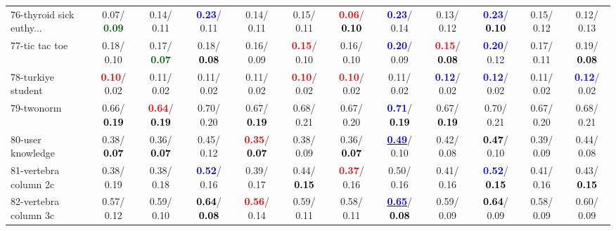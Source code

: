 \begin{table}[h]
\begin{center}
{\begin{tabular}{lc|c|c|c|c|c|c|c|c|c|c}
76-thyroid sick euthy... &   0.07/\textcolor{darkgreen}{\textbf{  0.09}} &   0.14/  0.11 & \textcolor{blue}{\textbf{  0.23}}/  0.11 &   0.14/  0.11 &   0.15/  0.11 & \textcolor{red}{\textbf{  0.06}}/\textcolor{black}{\textbf{  0.10}} & \textcolor{blue}{\textbf{  0.23}}/  0.14 &   0.13/  0.12 & \textcolor{blue}{\textbf{  0.23}}/\textcolor{black}{\textbf{  0.10}} &   0.15/  0.12 &   0.12/  0.13 \\
77-tic tac toe &   0.18/  0.10 &   0.17/\textcolor{darkgreen}{\textbf{  0.07}} &   0.18/\textcolor{black}{\textbf{  0.08}} &   0.16/  0.09 & \textcolor{red}{\textbf{  0.15}}/  0.10 &   0.16/  0.10 & \textcolor{blue}{\textbf{  0.20}}/  0.09 & \textcolor{red}{\textbf{  0.15}}/\textcolor{black}{\textbf{  0.08}} & \textcolor{blue}{\textbf{  0.20}}/  0.12 &   0.17/  0.11 &   0.19/\textcolor{black}{\textbf{  0.08}} \\
78-turkiye student & \textcolor{red}{\textbf{  0.10}}/  0.02 &   0.11/  0.02 &   0.11/  0.02 &   0.11/  0.02 & \textcolor{red}{\textbf{  0.10}}/  0.02 & \textcolor{red}{\textbf{  0.10}}/  0.02 &   0.11/  0.02 & \textcolor{blue}{\textbf{  0.12}}/  0.02 & \textcolor{blue}{\textbf{  0.12}}/  0.02 &   0.11/  0.02 & \textcolor{blue}{\textbf{  0.12}}/  0.02 \\ \hline
79-twonorm &   0.66/\textcolor{black}{\textbf{  0.19}} & \textcolor{red}{\textbf{  0.64}}/\textcolor{black}{\textbf{  0.19}} &   0.70/  0.20 &   0.67/\textcolor{black}{\textbf{  0.19}} &   0.68/  0.21 &   0.67/  0.20 & \textcolor{blue}{\textbf{  0.71}}/\textcolor{black}{\textbf{  0.19}} &   0.67/\textcolor{black}{\textbf{  0.19}} &   0.70/  0.21 &   0.67/  0.20 &   0.68/  0.21 \\
80-user knowledge &   0.38/\textcolor{black}{\textbf{  0.07}} &   0.36/\textcolor{black}{\textbf{  0.07}} &   0.45/  0.12 & \textcolor{red}{\textbf{  0.35}}/\textcolor{black}{\textbf{  0.07}} &   0.38/  0.09 &   0.36/\textcolor{black}{\textbf{  0.07}} & \underline{\textcolor{blue}{\textbf{  0.49}}}/  0.10 &   0.42/  0.08 & \textcolor{black}{\textbf{  0.47}}/  0.10 &   0.39/  0.09 &   0.44/  0.08 \\
81-vertebra column 2c &   0.38/  0.19 &   0.38/  0.18 & \textcolor{blue}{\textbf{  0.52}}/  0.16 &   0.39/  0.17 &   0.44/\textcolor{black}{\textbf{  0.15}} & \textcolor{red}{\textbf{  0.37}}/  0.16 &   0.50/  0.16 &   0.41/  0.16 & \textcolor{blue}{\textbf{  0.52}}/\textcolor{black}{\textbf{  0.15}} &   0.41/  0.16 &   0.43/\textcolor{black}{\textbf{  0.15}} \\
82-vertebra column 3c &   0.57/  0.12 &   0.59/  0.10 & \textcolor{black}{\textbf{  0.64}}/\textcolor{black}{\textbf{  0.08}} & \textcolor{red}{\textbf{  0.56}}/  0.14 &   0.59/  0.11 &   0.58/  0.11 & \underline{\textcolor{blue}{\textbf{  0.65}}}/\textcolor{black}{\textbf{  0.08}} &   0.59/  0.09 & \textcolor{black}{\textbf{  0.64}}/  0.09 &   0.58/  0.09 &   0.60/  0.09 \\

\end{tabular}}
\end{center}
\end{table}
